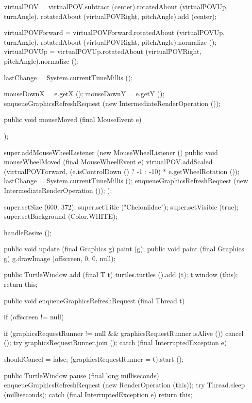 \documentclass{report}
\begin{document}
\begin{javacode}
{{{{{{            virtualPOV = virtualPOV.subtract (center).rotatedAbout (virtualPOVUp,    turnAngle).
                                                      rotatedAbout (virtualPOVRight, pitchAngle).add (center);

            virtualPOVForward = virtualPOVForward.rotatedAbout (virtualPOVUp,    turnAngle).
                                                  rotatedAbout (virtualPOVRight, pitchAngle).normalize ();
            virtualPOVUp      = virtualPOVUp.rotatedAbout      (virtualPOVRight, pitchAngle).normalize ();
          }

          lastChange = System.currentTimeMillis ();

          mouseDownX = e.getX ();
          mouseDownY = e.getY ();
          enqueueGraphicsRefreshRequest (new IntermediateRenderOperation ());
        }
      }
      public void mouseMoved (final MouseEvent e) {}
    });

    super.addMouseWheelListener (new MouseWheelListener  () {
      public void mouseWheelMoved (final MouseWheelEvent e) {
        virtualPOV.addScaled (virtualPOVForward, (e.isControlDown () ? -1 : -10) * e.getWheelRotation ());
        lastChange = System.currentTimeMillis ();
        enqueueGraphicsRefreshRequest (new IntermediateRenderOperation ());
      }});

    super.setSize       (600, 372);
    super.setTitle      ("Cheloniidae");
    super.setVisible    (true);
    super.setBackground (Color.WHITE);

    handleResize ();
  }

  public void update (final Graphics g) {paint (g);}
  public void paint  (final Graphics g) {g.drawImage (offscreen, 0, 0, null);}

  public TurtleWindow add (final T t) {turtles.turtles ().add (t); t.window (this); return this;}

  public void enqueueGraphicsRefreshRequest (final Thread t) {
    if (offscreen != null) {
      if (graphicsRequestRunner != null && graphicsRequestRunner.isAlive ()) {
        cancel ();
        try {graphicsRequestRunner.join ();}
        catch (final InterruptedException e) {}
      }

      shouldCancel = false;
      (graphicsRequestRunner = t).start ();
    }
  }

  public TurtleWindow pause (final long milliseconds) {
    enqueueGraphicsRefreshRequest (new RenderOperation (this));
    try {Thread.sleep (milliseconds);}
    catch (final InterruptedException e) {}
    return this;
  }

}
\end{javacode}
\end{document}
